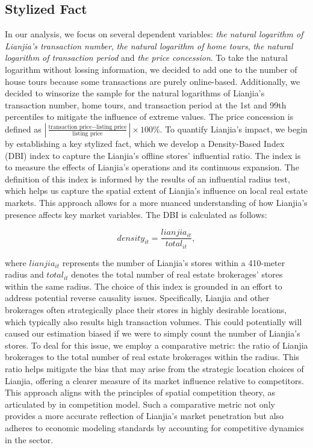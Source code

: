 \documentclass[11pt]{article}
\begin{document}
\subsection{Stylized Fact} \label{subsec:stylized_fact}

In our analysis, we focus on several dependent variables: \emph{the natural logarithm of Lianjia's transaction number}, \emph{the natural logarithm of home tours}, \emph{the natural logarithm of transaction period} and \emph{the price concession}. To take the natural logarithm without lossing information, we decided to add one to the number of house tours because some transactions are purely online-based. Additionally, we decided to winsorize the sample for the natural logarithms of Lianjia's transaction number, home tours, and transaction period at the 1st and 99th percentiles to mitigate the influence of extreme values. The price concession is defined as $|\frac{\text{transaction price} - \text{listing price}}{\text{listing price}}| \times 100\%$. To quantify Lianjia's impact, we begin by establishing a key stylized fact, which we develop a Density-Based Index (DBI) index to capture the Lianjia's offline stores' influential ratio. The index is to measure the effects of Lianjia's operations and its continuous expansion. The definition of this index is informed by the results of an influential radius test, which helps us capture the spatial extent of Lianjia's influence on local real estate markets. This approach allows for a more nuanced understanding of how Lianjia's presence affects key market variables. The DBI is calculated as follows:

\begin{equation*}
  density_{it} = \frac{lianjia_{it}}{total_{it}},
\end{equation*}

where $lianjia_{it}$ represents the number of Lianjia's stores within a 410-meter radius and $total_{it}$ denotes the total number of real estate brokerages' stores within the same radius. The choice of this index is grounded in an effort to address potential reverse causality issues. Specifically, Lianjia and other brokerages often strategically place their stores in highly desirable locations, which typically also results high transaction volumes. This could potentially will caused our estimation biased if we were to simply count the number of Lianjia's stores. To deal for this issue, we employ a comparative metric: the ratio of Lianjia brokerages to the total number of real estate brokerages within the radius. This ratio helps mitigate the bias that may arise from the strategic location choices of Lianjia, offering a clearer measure of its market influence relative to competitors. This approach aligns with the principles of spatial competition theory, as articulated by \citep{hotelling_stability_1929, daspremont_hotellings_1979} in competition model. Such a comparative metric not only provides a more accurate reflection of Lianjia's market penetration but also adheres to economic modeling standards by accounting for competitive dynamics in the sector.
\end{document}
